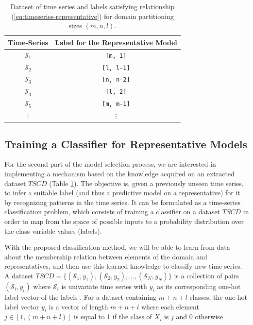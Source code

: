 \begin{table}[h]
	\centering
	\begin{tabular}{|c|c|}
		\hline
		Time-Series & Label for the Representative Model\\ \hline
		$\mathcal{S}_{1}$ & \texttt{[m, 1]} \\ \hline
		$\mathcal{S}_{2}$ & \texttt{[l, l-1]} \\ \hline
		$\mathcal{S}_{3}$ & \texttt{[n, n-2]} \\ \hline
		$\mathcal{S}_{4}$ & \texttt{[l, 2]} \\ \hline
		$\mathcal{S}_{5}$ & \texttt{[m, m-1]} \\ \hline
		$\vdots$ & $\vdots$ \\ \hline
	\end{tabular}
	\caption{Dataset of time series and labels satisfying relationship (\ref{eq:timeseries-representative}) for domain partitioning sizes $(m,n,l)$.}
	\label{Tab:TSClassificationDataset}
\end{table}

\subsection{Training a Classifier for Representative Models}
\label{Sec:TrainingClassifier}

For the second part of the model selection process, we are interested in implementing a mechanism based on the knowledge acquired on an extracted dataset $TSCD$ (Table \ref{Tab:TSClassificationDataset}). The objective is, given a previously unseen time series, to infer a suitable label (and thus a predictive model on a representative) for it by recognizing patterns in the time series. It can be formulated as a time-series classification problem, which consists of training a classifier on a dataset $TSCD$ in order to map from the space of possible inputs to a probability distribution over the class variable values (labels).  

With the proposed classification method, we will be able to learn from data about the membership relation between elements of the domain and representatives, and then use this learned knowledge to classify new time series. A dataset $TSCD=\{(\mathcal{S}_1,y_1),(\mathcal{S}_2,y_2), \ldots ,(\mathcal{S}_N,y_N)\}$ is a collection of pairs $(\mathcal{S}_i,y_i)$ where $\mathcal{S}_i$ is univariate time series with $y_i$ as its corresponding one-hot label vector of the labels \cite{Gulli2017}. For a dataset containing $m+n+l$ classes, the one-hot label vector $y_i$ is a vector of length $m+n+l$ where each element $j \in [1,(m+n+l)]$ is equal to 1 if the class of $X_i$ is $j$ and $0$ otherwise \cite{Mitsa2010}.


